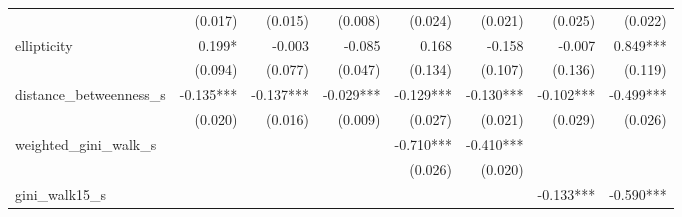 \begin{tabular}{lrrrrrrr}
                         &                      (0.017) &                    (0.015) &                      (0.008) &                      (0.024) &                    (0.021) &                                             (0.025) &                                             (0.022) \\ 
ellipticity              &                       0.199* &                     -0.003 &                       -0.085 &                        0.168 &                     -0.158 &                                              -0.007 &                                            0.849*** \\ 
                         &                      (0.094) &                    (0.077) &                      (0.047) &                      (0.134) &                    (0.107) &                                             (0.136) &                                             (0.119) \\ 
distance\_betweenness\_s &                    -0.135*** &                  -0.137*** &                    -0.029*** &                    -0.129*** &                  -0.130*** &                                           -0.102*** &                                           -0.499*** \\ 
                         &                      (0.020) &                    (0.016) &                      (0.009) &                      (0.027) &                    (0.021) &                                             (0.029) &                                             (0.026) \\ 
weighted\_gini\_walk\_s  &                              &                            &                              &                    -0.710*** &                  -0.410*** &                                                     &                                                     \\ 
                         &                              &                            &                              &                      (0.026) &                    (0.020) &                                                     &                                                     \\ 
gini\_walk15\_s          &                              &                            &                              &                              &                            &                                           -0.133*** &                                           -0.590*** \\ 

\end{tabular}
